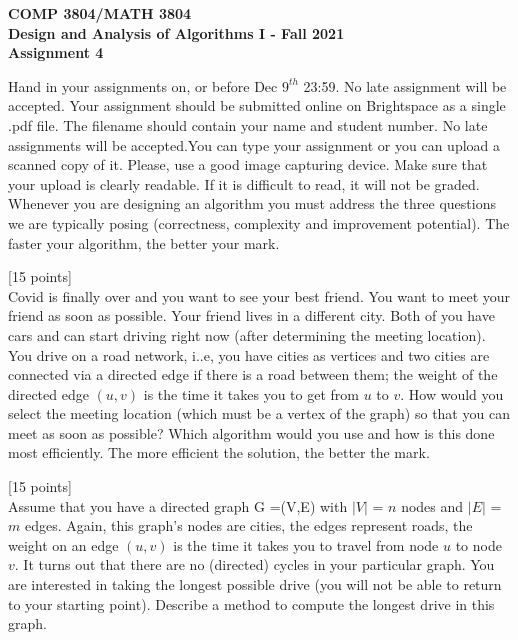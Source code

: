 \documentclass[12pt]{article}
\newcounter{ques}
\newenvironment{question}{\stepcounter{ques}{\noindent\bf Question \arabic{ques}:}}{\vspace{5mm}}
\begin{document}
 

\begin{center} \large\bf
COMP 3804/MATH 3804\\
Design and Analysis of Algorithms I  - 
Fall  2021\\
Assignment 4
\end{center} 

Hand in your assignments on, or before 
Dec $9^{th}$ 23:59. No late assignment will be accepted. Your assignment should be submitted online on Brightspace as a single .pdf file.  The filename should contain your name and student number. No late assignments will be accepted.You can type your assignment or you can upload a scanned copy of it.  Please, use a good image capturing device. Make sure that your upload is clearly readable. If it is difficult to read, it will not be graded. Whenever you are designing an algorithm you must address the three questions we are 
typically posing (correctness, complexity and improvement potential).
The faster your 
algorithm, the better your mark.     \\

\vspace{1em} 

\begin{question}[15 points]\\
Covid is finally over and    you want to see your best friend. You want to meet your friend as soon as possible. Your friend lives in a different city. Both of you have cars and can start driving right now (after determining the meeting location). You drive on a road network, i..e, you have cities as vertices and two cities are connected via a directed edge if there is a road between them; the weight of the directed edge $(u,v)$ is the time it takes you to get from $u$ to $v$. How would you select the meeting  location (which must be a vertex of the graph) so that you can meet as soon as possible? Which algorithm would you use and how is this done most efficiently. The more efficient the solution, the better the mark.
\end{question} 

\begin{question}[15 points]\\ 
  Assume that you have a directed graph G =(V,E) with $|V|$  = $n$ nodes and $|E|$ = $m$ edges. Again, this graph's nodes are cities, the edges  represent roads,  the weight on an edge $(u,v)$ is the time it takes you to travel from node $u$ to node $v$.  It turns out that there are no (directed) cycles in your particular graph.
  You are interested in taking the longest possible drive (you will not be able to return to your starting point).
  Describe a method to compute the longest drive in this graph. 

\end{question} 
\end{document}
